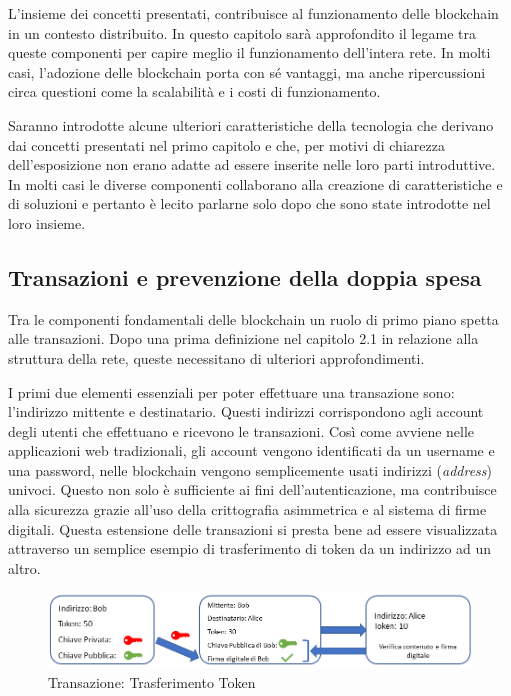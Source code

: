 L’insieme dei concetti presentati, contribuisce al funzionamento delle blockchain in un contesto distribuito. In questo capitolo sarà approfondito il legame tra queste componenti per capire meglio il funzionamento dell’intera rete. In molti casi, l’adozione delle blockchain porta con sé vantaggi, ma anche ripercussioni circa questioni come la scalabilità e i costi di funzionamento.

Saranno introdotte alcune ulteriori caratteristiche della tecnologia che derivano dai concetti presentati nel primo capitolo e che, per motivi di chiarezza dell’esposizione non erano adatte ad essere inserite nelle loro parti introduttive. In molti casi le diverse componenti collaborano alla creazione di caratteristiche e di soluzioni e pertanto è lecito parlarne solo dopo che sono state introdotte nel loro insieme.

\subsection{Transazioni e prevenzione della doppia spesa}

Tra le componenti fondamentali delle blockchain un ruolo di primo piano spetta alle transazioni. Dopo una prima definizione nel capitolo 2.1 in relazione alla struttura della rete, queste necessitano di ulteriori approfondimenti.

I primi due elementi essenziali per poter effettuare una transazione sono: l’indirizzo mittente e destinatario. Questi indirizzi corrispondono agli account degli utenti che effettuano e ricevono le transazioni. Così come avviene nelle applicazioni web tradizionali, gli account vengono identificati da un username e una password, nelle blockchain vengono semplicemente usati indirizzi (\emph{address}) univoci. Questo non solo è sufficiente ai fini dell’autenticazione, ma contribuisce alla sicurezza grazie all’uso della crittografia asimmetrica e al sistema di firme digitali. Questa estensione delle transazioni si presta bene ad essere visualizzata attraverso un semplice esempio di trasferimento di token da un indirizzo ad un altro.
\\

\begin{figure}[H]
\centering
\includegraphics[width=1\textwidth]{immagini/transazioneFinal.png}
\caption{Transazione: Trasferimento Token}
\label{fig:TransazioneToken}
\end{figure}

